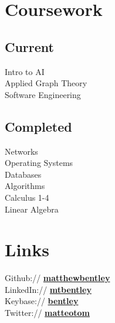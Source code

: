 \documentclass[letterpaper]{deedy-resume} %
\newcommand{\bul}{\textbullet{}}
\begin{document}
\begin{minipage}[t]{0.33\textwidth}

\section{Coursework}

\subsection{Current}

Intro to AI \\%
Applied Graph Theory \\%
Software Engineering

\sectionspace %


\subsection{Completed}

Networks \\%
Operating Systems \\%
Databases \\%
Algorithms \\%
Calculus 1-4 \\%
Linear Algebra


\sectionspace %


\section{Links}

Github:// \href{https://github.com/matthewbentley}{\bf matthewbentley} \\
LinkedIn:// \href{https://www.linkedin.com/in/mtbentley}{\bf mtbentley} \\
Keybase:// \href{https://keybase.io/bentley}{\bf bentley} \\
Twitter:// \href{https://twitter.com/matteotom}{\bf matteotom} \\

\sectionspace %



\end{minipage}
\end{document}
